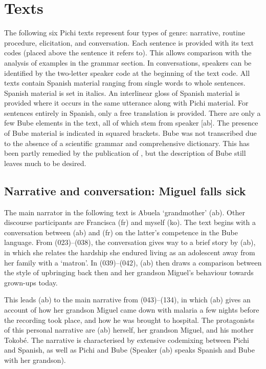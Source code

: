 \chapter{Texts}

The following six Pichi texts represent four types of genre: narrative, routine procedure, elicitation, and conversation. Each sentence is provided with its text codes (placed above the sentence it refers to). This allows comparison with the analysis of examples in the grammar section. In conversations, speakers can be identified by the two-letter speaker code at the beginning of the text code. All texts contain Spanish material ranging from single words to whole sentences. Spanish material is set in italics. An interlinear gloss of Spanish material is provided where it occurs in the same utterance along with Pichi material. For sentences entirely in Spanish, only a free translation is provided. There are only a few Bube elements in the text, all of which stem from speaker [ab]. The presence of Bube material is indicated in squared brackets. Bube was not transcribed due to the absence of a scientific grammar and comprehensive dictionary. This has been partly remedied by the publication of \citealt{Bolekia2009}, but the description of Bube still leaves much to be desired.

\section{Narrative and conversation: Miguel falls sick}

The main narrator in the following text is Abuela ‘grandmother’ (ab). Other discourse participants are Francisca (fr) and myself (ko). The text begins with a conversation between (ab) and (fr) on the latter’s competence in the Bube language. From (023)–(038), the conversation gives way to a brief story by (ab), in which she relates the hardship she endured living as an adolescent away from her family with a  ‘matron’. In (039)–(042), (ab) then draws a comparison between the style of upbringing back then and her grandson Miguel’s behaviour towards grown-ups today. 


This leads (ab) to the main narrative from (043)–(134), in which (ab) gives an account of how her grandson Miguel came down with malaria a few nights before the recording took place, and how he was brought to hospital. The protagonists of this personal narrative are (ab) herself, her grandson Miguel, and his mother Tokobé. The narrative is characterised by extensive codemixing between Pichi and Spanish, as well as Pichi and Bube (Speaker (ab) speaks Spanish and Bube with her grandson). 

